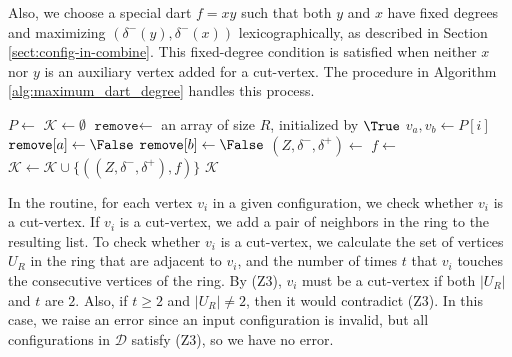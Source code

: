\documentclass[main.tex]{subfiles}
\begin{document}
Also, we choose a special dart $f=xy$ such that both $y$ and $x$ have fixed degrees and maximizing $(\delta^{-}(y), \delta^{-}(x))$ lexicographically, as described in Section \ref{sect:config-in-combine}.
This fixed-degree condition is satisfied when neither $x$ nor $y$ is an auxiliary vertex added for a cut-vertex.
The \maximumDartDegree procedure in Algorithm \ref{alg:maximum_dart_degree} handles this process.

\begin{algorithm}[H]
    \caption{\extendFromCutVerticesWithLink($N$, $R$, $\delta^-$, $\delta^+$, \texttt{rotations})}
    \label{alg:extend_from_cut_vertices}
    \begin{algorithmic}[1]
        \State $P \gets$  
        \State $\mathcal{K} \gets \emptyset$
            \State $\texttt{remove} \gets$ an array of size $R$, initialized by $\True$
                \State $v_a, v_b \gets P[i]$
                    \State $\texttt{remove}[a] \gets \False$
                \Else 
                    \State $\texttt{remove}[b] \gets \False$
                \EndIf
            \EndFor
            \State $(Z, \delta^-, \delta^+) \gets$ 
            \State $f \gets$ 
            \State $\mathcal{K} \gets \mathcal{K} \cup \{((Z, \delta^-, \delta^+), f)\}$
        \EndFor
        \State \Return $\mathcal{K}$
    \end{algorithmic}
\end{algorithm}

In the \findCutPairs routine, for each vertex $v_i$ in a given configuration, we check whether $v_i$ is a cut-vertex.
If $v_i$ is a cut-vertex, we add a pair of neighbors in the ring to the resulting list.
To check whether $v_i$ is a cut-vertex, we calculate the set of vertices $U_R$ in the ring that are adjacent to $v_i$, and the number of times $t$ that $v_i$ touches the consecutive vertices of the ring.
By (Z3), $v_i$ must be a cut-vertex if both $|U_R|$ and $t$ are $2$. 
Also, if $t \geq 2$ and $|U_R| \neq 2$, then it would contradict (Z3).
In this case, we raise an error since an input configuration is invalid, but all configurations in $\mathcal{D}$ satisfy (Z3), so we have no error.
\end{document}
